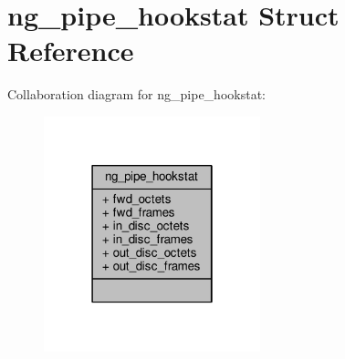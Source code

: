 \hypertarget{structng__pipe__hookstat}{\section{ng\+\_\+pipe\+\_\+hookstat Struct Reference}
\label{structng__pipe__hookstat}
}


Collaboration diagram for ng\+\_\+pipe\+\_\+hookstat\+:
\nopagebreak
\begin{figure}[H]
\begin{center}
\leavevmode
\includegraphics[width=178pt]{structng__pipe__hookstat__coll__graph}
\end{center}
\end{figure}
